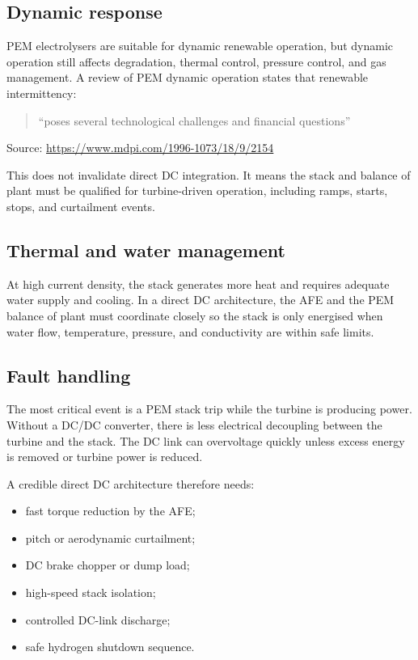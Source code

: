 \documentclass[
  letterpaper,
  DIV=11,
  numbers=noendperiod]{scrartcl}
\providecommand{\tightlist}{%
  \setlength{\itemsep}{0pt}\setlength{\parskip}{0pt}}
\begin{document}
\subsection{Dynamic response}\label{dynamic-response}

PEM electrolysers are suitable for dynamic renewable operation, but
dynamic operation still affects degradation, thermal control, pressure
control, and gas management. A review of PEM dynamic operation states
that renewable intermittency:

\begin{quote}
``poses several technological challenges and financial questions''
\end{quote}

Source: \url{https://www.mdpi.com/1996-1073/18/9/2154}

This does not invalidate direct DC integration. It means the stack and
balance of plant must be qualified for turbine-driven operation,
including ramps, starts, stops, and curtailment events.

\subsection{Thermal and water
management}\label{thermal-and-water-management}

At high current density, the stack generates more heat and requires
adequate water supply and cooling. In a direct DC architecture, the AFE
and the PEM balance of plant must coordinate closely so the stack is
only energised when water flow, temperature, pressure, and conductivity
are within safe limits.

\subsection{Fault handling}\label{fault-handling}

The most critical event is a PEM stack trip while the turbine is
producing power. Without a DC/DC converter, there is less electrical
decoupling between the turbine and the stack. The DC link can
overvoltage quickly unless excess energy is removed or turbine power is
reduced.

A credible direct DC architecture therefore needs:

\begin{itemize}
\tightlist
\item
  fast torque reduction by the AFE;
\item
  pitch or aerodynamic curtailment;
\item
  DC brake chopper or dump load;
\item
  high-speed stack isolation;
\item
  controlled DC-link discharge;
\item
  safe hydrogen shutdown sequence.
\end{itemize}
\end{document}
